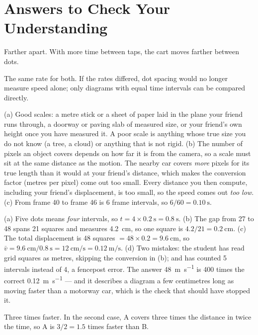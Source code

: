 \documentclass[11pt,twoside,openany]{book}
\newcounter{check}[chapter]
\begin{document}
\section*{Answers to Check Your Understanding}
\begin{description}[leftmargin=2em,itemsep=2pt]
  \item[1.1] Farther apart. With more time between taps, the cart moves farther between dots.
  \item[1.2] The same rate for both. If the rates differed, dot spacing would no longer measure speed alone; only diagrams with equal time intervals can be compared directly.
  \item[1.3] (a) Good scales: a metre stick or a sheet of paper laid in the plane your friend runs through, a doorway or paving slab of measured size, or your friend's own height once you have measured it. A poor scale is anything whose true size you do not know (a tree, a cloud) or anything that is not rigid. (b) The number of pixels an object covers depends on how far it is from the camera, so a scale must sit at the same distance as the motion. The nearby car covers \emph{more} pixels for its true length than it would at your friend's distance, which makes the conversion factor (metres per pixel) come out too small. Every distance you then compute, including your friend's displacement, is too small, so the speed comes out \emph{too low}. (c) From frame \num{40} to frame \num{46} is \num{6} frame intervals, so $6/60 = \SI{0.10}{\second}$.
  \item[1.4] (a) Five dots means \emph{four} intervals, so $t = 4 \times \SI{0.2}{\second} = \SI{0.8}{\second}$. (b) The gap from \num{27} to \num{48} spans \num{21} squares and measures \SI{4.2}{\centi\metre}, so one square is $4.2/21 = \SI{0.2}{\centi\metre}$. (c) The total displacement is \num{48} squares $= 48 \times 0.2 = \SI{9.6}{\centi\metre}$, so $\bar v = \SI{9.6}{\centi\metre}/\SI{0.8}{\second} = \SI{12}{\centi\metre\per\second} = \SI{0.12}{\metre\per\second}$. (d) Two mistakes: the student has read grid squares as metres, skipping the conversion in (b); and has counted \num{5} intervals instead of \num{4}, a fencepost error. The answer \SI{48}{\metre\per\second} is \num{400} times the correct \SI{0.12}{\metre\per\second} --- and it describes a diagram a few centimetres long as moving faster than a motorway car, which is the check that should have stopped it.
  \item[1.5] Three times faster. In the second case, A covers three times the distance in twice the time, so A is $3/2 = 1.5$ times faster than B.

\end{description}
\end{document}
